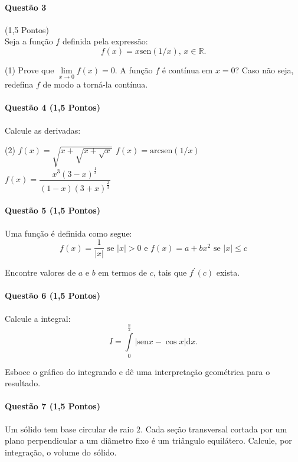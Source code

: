 \documentclass[12pt,a4paper]{article}
\newcommand{\R}{\mathbb{R}}
\newcommand{\modu}[1]{\vert #1 \vert}
\begin{document}
\paragraph{Questão 3} (1,5 Pontos)\\
Seja a função $f$ definida pela expressão:$$f(x) = x\mathrm{sen}(1/x),\, x\in \R.$$

\begin{tasks}(1)
\task Prove que $\lim\limits_{x\to 0} f(x) = 0$.
\task A função $f$ é contínua em $x=0$? Caso não seja, redefina $f$ de modo a torná-la contínua.
\end{tasks}

\paragraph{Questão 4 (1,5 Pontos)}

Calcule as derivadas:

\begin{tasks}(2)
\task $f(x) = \sqrt{x+\sqrt{x+\sqrt{x}}}$
\task $f(x) = \mathrm{arcsen}(1/x)$
\task $f(x) = \dfrac{x^3(3-x)^{\frac{1}{3}}}{(1-x)(3+x)^{\frac{2}{3}}}$
\end{tasks}

\paragraph{Questão 5 (1,5 Pontos)}

Uma função é definida como segue: $$f(x) = \dfrac{1}{\modu{x}} \text{ se }\modu{x}>0 \text{ e } f(x) = a + bx^2 \text{ se }\modu{x} \le c$$

Encontre valores de $a$ e $b$ em termos de $c$, tais que $f^{\prime}(c)$ exista.

\paragraph{Questão 6 (1,5 Pontos)}

Calcule a integral: $$I = \int\limits_{0}^{\frac{n}{2}} \vert \mathrm{sen} x - \cos x \vert \mathrm{d}x.$$

Esboce o gráfico do integrando e dê uma interpretação geométrica para o resultado.

\paragraph{Questão 7 (1,5 Pontos)}

Um sólido tem base circular de raio $2$. Cada seção transversal cortada por um plano perpendicular a um diâmetro fixo é um triângulo equilátero. Calcule, por integração, o volume do sólido.
\end{document}
